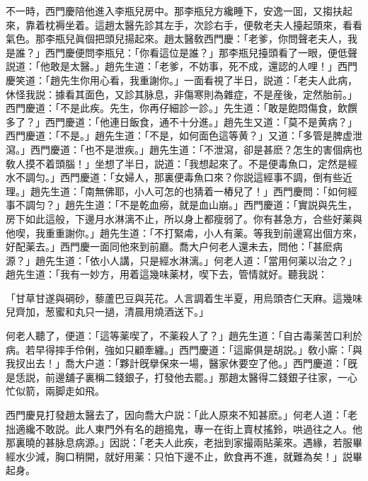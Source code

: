 不一時，西門慶陪他進入李瓶兒房中。那李瓶兒方纔睡下，安逸一囬，又搊扶起來，靠着枕褥坐着。這趙太醫先診其左手，次診右手，便敎老夫人擡起頭來，看看氣色。那李瓶兒眞個把頭兒揚起來。趙太醫敎西門慶：「老爹，你問聲老夫人，我是誰？」西門慶便問李瓶兒：「你看這位是誰？」那李瓶兒擡頭看了一眼，便低聲説道：「他敢是太醫。」趙先生道：「老爹，不妨事，死不成，還認的人哩！」西門慶笑道：「趙先生你用心看，我重謝你。」一面看視了半日，説道：「老夫人此病，休怪我説：據看其面色，又診其脉息，非傷寒則為雜症，不是産後，定然胎前。」西門慶道：「不是此疾。先生，你再仔細診一診。」先生道：「敢是飽悶傷食，飲饌多了？」西門慶道：「他連日飯食，通不十分進。」趙先生又道：「莫不是黄病？」西門慶道：「不是。」趙先生道：「不是，如何面色這等黄？」又道：「多管是脾虚泄瀉。」西門慶道：「也不是泄疾。」趙先生道：「不泄瀉，卻是甚麽？怎生的害個病也敎人摸不着頭腦！」坐想了半日，説道：「我想起來了。不是便毒魚口，定然是經水不調匀。」西門慶道：「女婦人，那裏便毒魚口來？你説這經事不調，倒有些近理。」趙先生道：「南無佛耶，小人可怎的也猜着一樁兒了！」西門慶問：「如何經事不調匀？」趙先生道：「不是乾血癆，就是血山崩。」西門慶道：「實説與先生，房下如此這般，下邊月水淋漓不止，所以身上都瘦弱了。你有甚急方，合些好薬與他喫，我重重謝你。」趙先生道：「不打緊䖏，小人有薬。等我到前邊寫出個方來，好配薬去。」西門慶一面同他來到前廳。喬大户何老人還未去，問他：「甚麽病源？」趙先生道：「依小人講，只是經水淋漓。」何老人道：「當用何薬以治之？」趙先生道：「我有一妙方，用着這幾味薬材，喫下去，管情就好。聽我説：

\begin{myquote}
「甘草甘遂與碙砂，藜蘆巴豆與芫花。人言調着生半夏，用烏頭杏仁天麻。這幾味兒齊加，葱蜜和丸只一撾，清晨用燒酒送下。」
\end{myquote}

何老人聽了，便道：「這等薬喫了，不薬殺人了？」趙先生道：「自古毒薬苦口利於病。若早得摔手伶俐，強如只顧牽纏。」西門慶道：「這廝俱是胡説。」敎小廝：「與我扠出去！」喬大户道：「夥計旣擧保來一場，醫家休要空了他。」西門慶道：「旣是恁説，前邊舖子裏稱二錢銀子，打發他去罷。」那趙太醫得二錢銀子往家，一心忙似箭，兩脚走如飛。

西門慶見打發趙太醫去了，因向喬大户説：「此人原來不知甚麽。」何老人道：「老拙適纔不敢説。此人東門外有名的趙搗鬼，專一在街上賣杖搖鈴，哄過往之人。他那裏曉的甚脉息病源。」因説：「老夫人此疾，老拙到家撮兩貼薬來。遇緣，若服畢經水少減，胸口稍開，就好用薬：只怕下邊不止，飲食再不進，就難為矣！」説畢起身。

